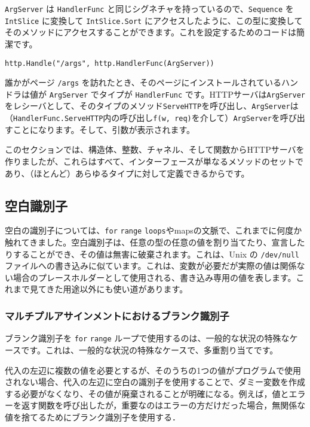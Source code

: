 \documentclass{jsarticle}
\begin{document}
\texttt{ArgServer} は \texttt{HandlerFunc}
と同じシグネチャを持っているので、\texttt{Sequence} を \texttt{IntSlice}
に変換して \texttt{IntSlice.Sort}
にアクセスしたように、この型に変換してそのメソッドにアクセスすることができます。これを設定するためのコードは簡潔です。

\begin{lstlisting}[numbers=none]
http.Handle("/args", http.HandlerFunc(ArgServer))
\end{lstlisting}

誰かがページ \texttt{/args}
を訪れたとき、そのページにインストールされているハンドラは値が
\texttt{ArgServer} でタイプが \texttt{HandlerFunc}
です。HTTPサーバは\texttt{ArgServer}をレシーバとして、そのタイプのメソッド\texttt{ServeHTTP}を呼び出し、\texttt{ArgServer}は（\texttt{HandlerFunc.ServeHTTP}内の呼び出し\texttt{f(w,\ req)}を介して）\texttt{ArgServer}を呼び出すことになります。そして、引数が表示されます。

このセクションでは、構造体、整数、チャネル、そして関数からHTTPサーバを作りましたが、これらはすべて、インターフェースが単なるメソッドのセットであり、（ほとんど）あらゆるタイプに対して定義できるからです。

\subsection{空白識別子}

空白の識別子については、{\texttt{for}
\texttt{range}
\texttt{loops}}や{maps}の文脈で、これまでに何度か触れてきました。空白識別子は、任意の型の任意の値を割り当てたり、宣言したりすることができ、その値は無害に破棄されます。これは、Unix
の \texttt{/dev/null}
ファイルへの書き込みに似ています。これは、変数が必要だが実際の値は関係ない場合のプレースホルダーとして使用される、書き込み専用の値を表します。これまで見てきた用途以外にも使い道があります。

\subsubsection{マルチプルアサインメントにおけるブランク識別子}

ブランク識別子を \texttt{for} \texttt{range}
ループで使用するのは、一般的な状況の特殊なケースです。これは、一般的な状況の特殊なケースで、多重割り当てです。

代入の左辺に複数の値を必要とするが、そのうちの1つの値がプログラムで使用されない場合、代入の左辺に空白の識別子を使用することで、ダミー変数を作成する必要がなくなり、その値が廃棄されることが明確になる。例えば，値とエラーを返す関数を呼び出したが，重要なのはエラーの方だけだった場合，無関係な値を捨てるためにブランク識別子を使用する．
\end{document}
